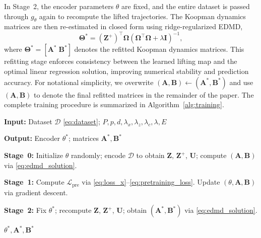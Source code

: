 \documentclass[journal]{IEEEtran}
\newcommand{\mA}{\mathbf{A}}
\newcommand{\mB}{\mathbf{B}}
\newcommand{\mZ}{\mathbf{Z}}
\newcommand{\mU}{\mathbf{U}}
\newcommand{\mI}{\mathbf{I}}
\newcommand{\mTheta}{\boldsymbol{\Theta}}
\newcommand{\mOmega}{\boldsymbol{\Omega}}
\begin{document}
In Stage~2, the encoder parameters $\theta$ are fixed, and the entire dataset is passed through $g_\theta$ again to recompute the lifted trajectories. The Koopman dynamics matrices are then re-estimated in closed form using ridge-regularized EDMD,
\begin{equation}
    \mTheta^{*} = (\mZ^{+})^\top \mOmega
    \left(\mOmega^\top \mOmega + \lambda \mI\right)^{-1},
\end{equation}
where $\mTheta^{*} = [\mA^{*}\;\mB^{*}]$ denotes the refitted Koopman dynamics matrices. This refitting stage enforces consistency between the learned lifting map and the optimal linear regression solution, improving numerical stability and prediction accuracy. For notational simplicity, we overwrite
$(\mA,\mB)\leftarrow(\mA^{*},\mB^{*})$ and use $(\mA,\mB)$ to denote the final refitted matrices in the remainder of the paper.
The complete training procedure is summarized in Algorithm~\ref{alg:training}.

\begin{algorithm}[!t]
\caption{Transformer-Koopman Training Algorithm}
\label{alg:training}
\begin{algorithmic}[1]

\STATE \textbf{Input:} Dataset $\mathcal{D}$ \eqref{eq:dataset};
$P, p, d, \lambda_x, \lambda_z, \lambda_c, \lambda, E$

\STATE \textbf{Output:} Encoder $\theta^{*}$; matrices $\mA^{*}, \mB^{*}$

\STATE \textbf{Stage~0:}
Initialize $\theta$ randomly; encode $\mathcal{D}$ to obtain
$\mZ$, $\mZ^{+}$, $\mU$; compute $(\mA,\mB)$ via
\eqref{eq:edmd_solution}.

\vspace{2pt}

\STATE \textbf{Stage~1:}
        \STATE Compute $\mathcal{L}_{\mathrm{pre}}$
               via \eqref{eq:loss_x}--\eqref{eq:pretraining_loss}.
        \STATE Update $(\theta, \mA, \mB)$ via gradient descent.
    \ENDFOR
\ENDFOR

\vspace{2pt}

\STATE \textbf{Stage~2:}
Fix $\theta^{*}$; recompute $\mZ$, $\mZ^{+}$, $\mU$;
obtain $(\mA^{*}, \mB^{*})$ via \eqref{eq:edmd_solution}.

\RETURN $\theta^{*}, \mA^{*}, \mB^{*}$

\end{algorithmic}
\end{algorithm}
\end{document}
